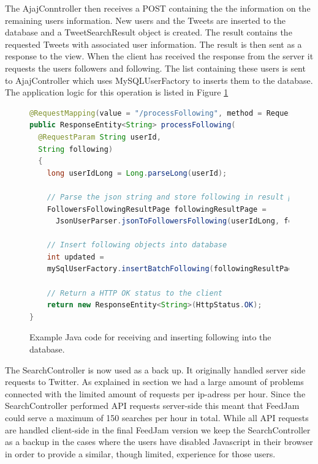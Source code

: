 The AjajConntroller then receives a POST containing the the information on the remaining users information. New users and the Tweets are inserted to the database and a TweetSearchResult object is created. The result contains the requested Tweets with associated user information. The result is then sent as a response to the view. When the client has received the response from the server it requests the users followers and following. The list containing these users is sent to AjajController which uses MySQLUserFactory to inserts them to the database. The application logic for this operation is listed in Figure \ref{javaProcessFollowing}

\begin{figure}[h!]
\begin{lstlisting}[language=java]
@RequestMapping(value = "/processFollowing", method = RequestMethod.POST)
public ResponseEntity<String> processFollowing(
  @RequestParam String userId,
  String following) 
  {
    long userIdLong = Long.parseLong(userId);
    
    // Parse the json string and store following in result page object
    FollowersFollowingResultPage followingResultPage = 
      JsonUserParser.jsonToFollowersFollowing(userIdLong, following);
    
    // Insert following objects into database
    int updated = 
    mySqlUserFactory.insertBatchFollowing(followingResultPage);

    // Return a HTTP OK status to the client				
    return new ResponseEntity<String>(HttpStatus.OK);
}
\end{lstlisting}
\caption{Example Java code for receiving and inserting following into the database.}
\label{javaProcessFollowing}
\end{figure}

The SearchController is now used as a back up. It originally handled server side requests to Twitter. As explained in section \label{twitterProblem} we had a large amount of problems connected with the limited amount of requests per ip-adress per hour. Since the SearchController performed API requests server-side this meant that FeedJam could serve a maximum of 150 searches per hour in total. While all API requests are handled client-side in the final FeedJam version we keep the SearchController as a backup in the cases where the users have disabled Javascript in their browser in order to provide a similar, though limited, experience for those users.


